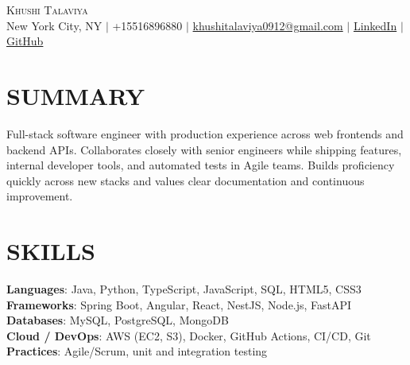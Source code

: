 \documentclass[letterpaper,11pt]{article}
\begin{document}
\begin{center}
    {\Huge \scshape Khushi Talaviya} \\ \vspace{2pt}
    \vspace{4pt}
    \small
    New York City, NY $|$
    \small
    +15516896880 $|$
    \href{mailto:khushitalaviya0912@gmail.com}{khushitalaviya0912@gmail.com} $|$
    \href{https://www.linkedin.com/in/khushitalaviya/}{LinkedIn} $|$
    \href{https://github.com/talaviyakhushi}{GitHub}
\end{center}

\section{SUMMARY}
\vspace{5pt}
\small{Full-stack software engineer with production experience across web frontends and backend APIs. Collaborates closely with senior engineers while shipping features, internal developer tools, and automated tests in Agile teams. Builds proficiency quickly across new stacks and values clear documentation and continuous improvement.}

\vspace{2pt}
\section{SKILLS}
\vspace{5pt}
\begin{itemize}[leftmargin=0in, label={}]
\small{\item{
\textbf{Languages}{: Java, Python, TypeScript, JavaScript, SQL, HTML5, CSS3} \\
\textbf{Frameworks}{: Spring Boot, Angular, React, NestJS, Node.js, FastAPI} \\
\textbf{Databases}{: MySQL, PostgreSQL, MongoDB} \\
\textbf{Cloud / DevOps}{: AWS (EC2, S3), Docker, GitHub Actions, CI/CD, Git} \\
\textbf{Practices}{: Agile/Scrum, unit and integration testing}
}}
\end{itemize}
\vspace{-10pt}

\end{document}
